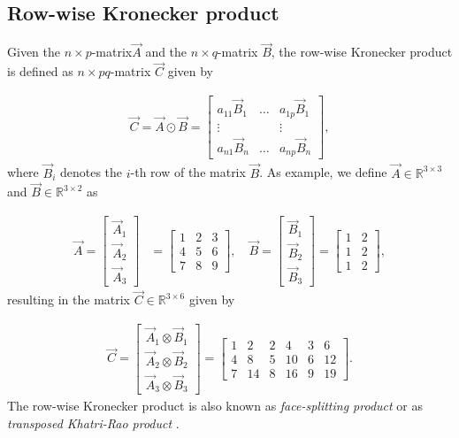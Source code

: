 \begin{appendices}
\section{Row-wise Kronecker product} \label{apx:AppendixKroneckerRowWise}

Given the $n \times p$-matrix$\vec{A}$ and the $n \times q$-matrix $\vec{B}$, the row-wise Kronecker product is defined as $n \times pq$-matrix $\vec{C}$ given by

\begin{align}
	\vec{C} = \vec{A} \odot \vec{B} = 
			\begin{bmatrix}
				a_{11} \vec{B}_1 & \dots & a_{1p} \vec{B}_1 \\
				\vdots 	   &         &  \vdots \\
				a_{n1} \vec{B}_n & \dots  & a_{np} \vec{B}_n     
			\end{bmatrix},
\end{align}
%
where $\vec{B}_i$ denotes the $i$-th row of the matrix $\vec{B}$. As example, we define $\vec{A} \in \mathbb{R}^{3 \times 3}$ and $\vec{B} \in \mathbb{R}^{3 \times 2}$ as

\begin{align}
	\vec{A} = 
		\begin{bmatrix}
			\vec{A}_1 \\
			\vec{A}_2 \\
			\vec{A}_3 
		\end{bmatrix} &= 
		\begin{bmatrix}
			1 & 2 & 3 \\
			4 & 5 & 6 \\
			7 & 8 & 9 
		\end{bmatrix}, \quad 
	\vec{B} = 
		\begin{bmatrix}
			\vec{B}_1 \\
			\vec{B}_2 \\
			\vec{B}_3 
		\end{bmatrix} = 
		\begin{bmatrix}
			1 & 2  \\
			1 & 2  \\
			1 & 2  
		\end{bmatrix},
\end{align}
%
resulting in the matrix $\vec{C} \in \mathbb{R}^{3 \times 6}$ given by

\begin{align}
		\vec{C} = 
	\begin{bmatrix}
		\vec{A}_1 \otimes \vec{B}_1 \\
		\vec{A}_2 \otimes \vec{B}_2 \\
		\vec{A}_3 \otimes \vec{B}_3 
	\end{bmatrix} = 
	\begin{bmatrix}
		1 & 2 & 2 & 4 & 3 & 6 \\
		4 & 8 & 5 &10 & 6 & 12\\
		7 & 14& 8 & 16& 9 & 19 
	\end{bmatrix}.
\end{align}
%
The row-wise Kronecker product is also known as \emph{face-splitting product} or as \emph{transposed Khatri-Rao product} \cite{slyusar1997analytical}.


\end{appendices}
